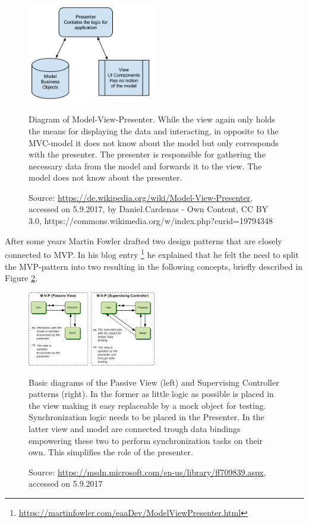 \begin{figure}[htbp]
	\centering
	\label{fig:mvp}
	\includegraphics[width=0.5\textwidth]{./content/pictures/mvp.png}
	\caption{Diagram of Model-View-Presenter. While the view again only holds the means for displaying the data and interacting, in opposite to the MVC-model it does not know about the model but only corresponds with the presenter. The presenter is responsible for gathering the necessary data from the model and forwards it to the view. The model does not know about the presenter.}
	\caption*{Source: \href{https://de.wikipedia.org/wiki/Model-View-Presenter}{https://de.wikipedia.org/wiki/Model-View-Presenter}, accessed on 5.9.2017, by Daniel.Cardenas - Own Content, CC BY 3.0, https://commons.wikimedia.org/w/index.php?curid=19794348}
\end{figure}


After some years Martin Fowler drafted two design patterns that are closely connected to MVP. In his blog entry \footnote{\href{https://martinfowler.com/eaaDev/ModelViewPresenter.html}{https://martinfowler.com/eaaDev/ModelViewPresenter.html}} he explained that he felt the need to split the MVP-pattern into two resulting in the following concepts, briefly described in Figure \ref{fig:passive-view-supervision-controller}. 

\begin{figure}[htbp]
	\centering
	\label{fig:passive-view-supervision-controller}
	\includegraphics[width=0.5\textwidth]{./content/pictures/passive-view.png}
	\caption{Basic diagrams of the Passive View (left) and Supervising Controller patterns (right). In the former as little logic as possible is placed in the view making it easy replaceable by a mock object for testing. Synchronization logic needs to be placed in the Presenter. In the latter view and model are connected trough data bindings empowering these two to perform synchronization tasks on their own. This simplifies the role of the presenter.}
	\caption*{Source: \href{https://msdn.microsoft.com/en-us/library/ff709839.aspx}{https://msdn.microsoft.com/en-us/library/ff709839.aspx}, accessed on 5.9.2017}
\end{figure}

